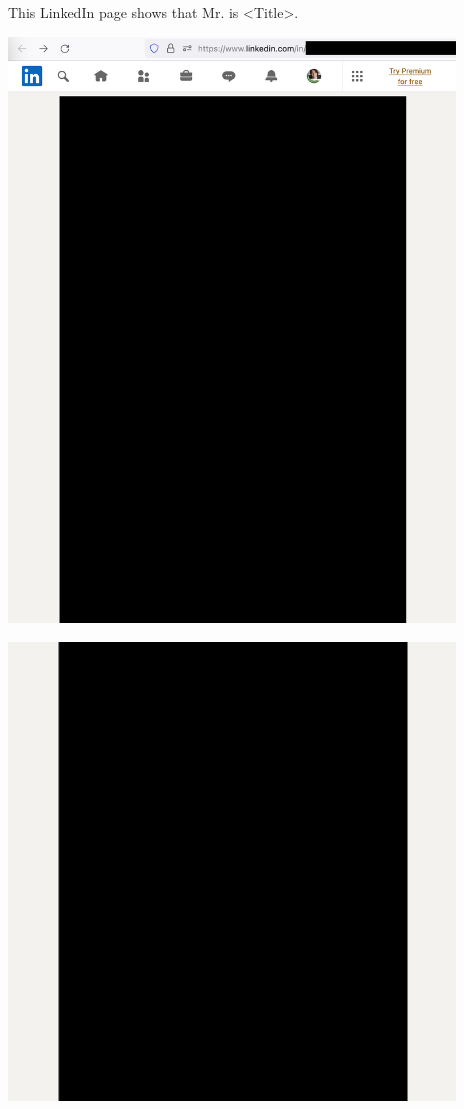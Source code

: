 
This LinkedIn page shows that Mr. \MrAkvelon is <Title>.

\begin{center}
    \includegraphics[width=32em]{akvelon-linkedin-p1_public}
\end{center}
\WillContinue
\pagebreak

\Continuing
\begin{center}
    \includegraphics[width=32em]{akvelon-linkedin-p2_public}
\end{center}

\pagebreak
